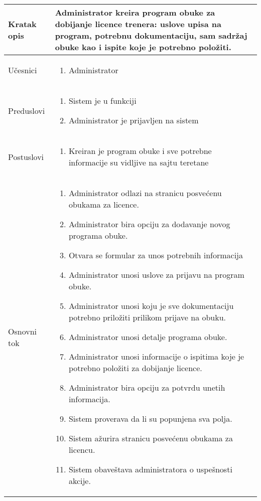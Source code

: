 \documentclass[../../main.tex]{subfiles}
\begin{document}
\begin{longtable}{| p{} | p{} |} 
\hline
    Kratak opis & Administrator kreira program obuke za dobijanje licence trenera: uslove upisa na program, potrebnu dokumentaciju, sam sadržaj obuke kao i ispite koje je potrebno položiti.  \\ 
\hline    
    Učesnici &
    \begin{enumerate}
        \item Administrator
    \end{enumerate}\\
\hline
   Preduslovi &
   \begin{enumerate}
        \item Sistem je u funkciji
        \item Administrator je prijavljen na sistem
    \end{enumerate}\\
\hline  
    Postuslovi & 
    \begin{enumerate}
        \item Kreiran je program obuke i sve potrebne informacije su vidljive na sajtu teretane
    \end{enumerate} \\
\hline
    Osnovni tok & 
    \begin{enumerate}
        \item Administrator odlazi na stranicu posvećenu obukama za licence.
        \item Administrator bira opciju za dodavanje novog programa obuke.
        \item Otvara se formular za unos potrebnih informacija 
        \item Administrator unosi uslove za prijavu na program obuke.
        \item Administrator unosi koju je sve dokumentaciju potrebno priložiti prilikom prijave na obuku.
        \item Administrator unosi detalje programa obuke.
        \item Administrator unosi informacije o ispitima koje je potrebno položiti za dobijanje licence.
        \item Administrator bira opciju za potvrdu unetih informacija.
        \item Sistem proverava da li su popunjena sva polja.
        \item Sistem ažurira stranicu posvećenu obukama za licencu.
        \item Sistem obaveštava administratora o uspešnosti akcije.

\end{enumerate}
\end{longtable}
\end{document}
